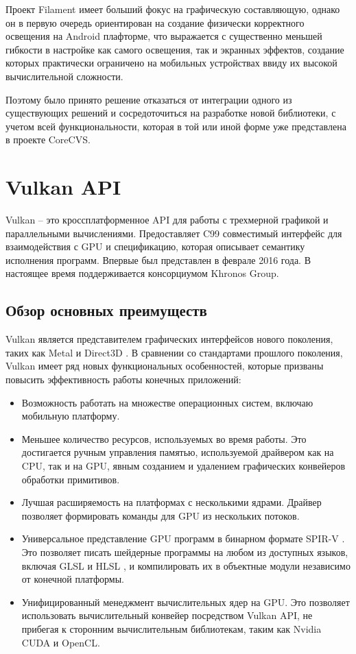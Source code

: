 \documentclass[14pt]{matmex-diploma}
\begin{document}
Проект Filament имеет больший фокус на графическую составляющую, однако он в первую очередь ориентирован на создание физически корректного освещения на Android плафторме, что выражается с существенно меньшей гибкости в настройке как самого освещения, так и экранных эффектов, создание которых практически ограничено на мобильных устройствах ввиду их высокой вычислительной сложности.

Поэтому было принято решение отказаться от интеграции одного из существующих решений и сосредоточиться на разработке новой библиотеки, с учетом всей функциональности, которая в той или иной форме уже представлена в проекте CoreCVS. 


\section{Vulkan API}

Vulkan -- это кроссплатформенное API для работы с трехмерной графикой и параллельными вычислениями. Предоставляет C99 совместимый интерфейс для взаимодействия с GPU и спецификацию, которая описывает семантику исполнения программ. Впервые был представлен в феврале 2016 года. В настоящее время поддерживается консорциумом Khronos Group. 

\subsection{Обзор основных преимуществ}

Vulkan является представителем графических интерфейсов нового поколения, таких как Metal \cite{spec:metal} и Direct3D \cite{spec:direct3d}. В сравнении со стандартами прошлого поколения, Vulkan имеет ряд новых функциональных особенностей, которые призваны повысить эффективность работы конечных приложений:

\begin{itemize}
    \item Возможность работать на множестве операционных систем, включаю мобильную платформу.
    \item Меньшее количество ресурсов, используемых во время работы. Это достигается ручным управления памятью, используемой драйвером как на CPU, так и на GPU, явным созданием и удалением графических конвейеров обработки примитивов.
    \item Лучшая расширяемость на платформах с несколькими ядрами. Драйвер позволяет формировать команды для GPU из нескольких потоков. 
    \item Универсальное представление GPU программ в бинарном формате SPIR-V \cite{spec:spirv}. Это позволяет писать шейдерные программы на любом из доступных языков, включая GLSL \cite{spec:glsl} и HLSL \cite{spec:hlsl}, и компилировать их в объектные модули независимо от конечной платформы. 
    \item Унифицированный менеджмент вычислительных ядер на GPU. Это позволяет использовать вычислительный конвейер посредством Vulkan API, не прибегая к сторонним вычислительным библиотекам, таким как Nvidia CUDA и OpenCL.
\end{itemize}
\end{document}
